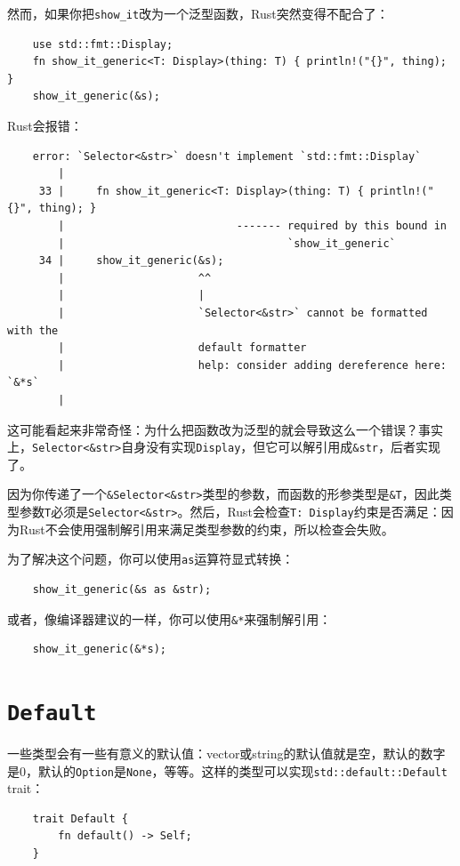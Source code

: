 然而，如果你把\texttt{show\_it}改为一个泛型函数，Rust突然变得不配合了：
\begin{verbatim}
    use std::fmt::Display;
    fn show_it_generic<T: Display>(thing: T) { println!("{}", thing); }
    show_it_generic(&s);
\end{verbatim}

Rust会报错：
\begin{verbatim}
    error: `Selector<&str>` doesn't implement `std::fmt::Display`
        |
     33 |     fn show_it_generic<T: Display>(thing: T) { println!("{}", thing); }
        |                           ------- required by this bound in
        |                                   `show_it_generic`
     34 |     show_it_generic(&s);
        |                     ^^
        |                     |
        |                     `Selector<&str>` cannot be formatted with the
        |                     default formatter
        |                     help: consider adding dereference here: `&*s`
        |
\end{verbatim}

这可能看起来非常奇怪：为什么把函数改为泛型的就会导致这么一个错误？事实上，\texttt{Selector<\&str>}自身没有实现\texttt{Display}，但它可以解引用成\texttt{\&str}，后者实现了。

因为你传递了一个\texttt{\&Selector<\&str>}类型的参数，而函数的形参类型是\texttt{\&T}，因此类型参数\texttt{T}必须是\texttt{Selector<\&str>}。然后，Rust会检查\texttt{T: Display}约束是否满足：因为Rust不会使用强制解引用来满足类型参数的约束，所以检查会失败。

为了解决这个问题，你可以使用\texttt{as}运算符显式转换：
\begin{verbatim}
    show_it_generic(&s as &str);
\end{verbatim}

或者，像编译器建议的一样，你可以使用\texttt{\&*}来强制解引用：
\begin{verbatim}
    show_it_generic(&*s);
\end{verbatim}

\section{\texttt{Default}}\label{default}

一些类型会有一些有意义的默认值：vector或string的默认值就是空，默认的数字是0，默认的\texttt{Option}是\texttt{None}，等等。这样的类型可以实现\texttt{std::default::Default} trait：
\begin{verbatim}
    trait Default {
        fn default() -> Self;
    }
\end{verbatim}

